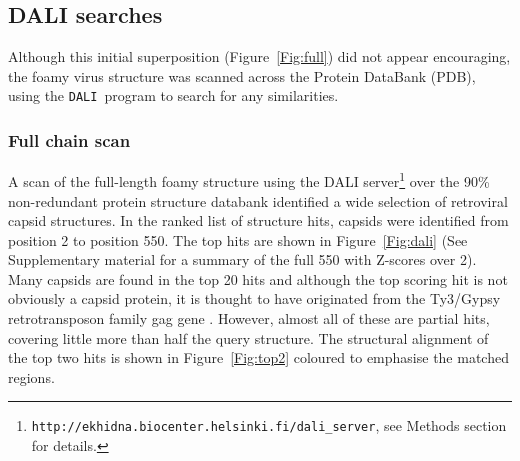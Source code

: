 \documentclass[12pt]{article}
\newcommand{\Fig}[1]{Figure~\ref{Fig:#1}}
\newcommand{\3}{$3_{10}$}
\newcommand{\DALI}{{\tt DALI}}
\begin{document}
\subsection{DALI searches}

Although this initial superposition (\Fig{full}) did not appear encouraging, the foamy virus structure
was scanned across the Protein DataBank (PDB), using the \DALI\ program \cite{HolmLet93a} to search for any similarities.

\subsubsection{Full chain scan}

A scan of the full-length foamy structure using the DALI server\footnote{
{\tt http://ekhidna.biocenter.helsinki.fi/dali\_server},
see Methods section for details.
}
over the 90\% non-redundant protein structure databank
identified a wide selection of retroviral capsid structures.  In the ranked list of structure hits,
capsids were identified from position 2 to position 550.
The top hits are shown in \Fig{dali} (See Supplementary material for a summary of
the full 550 with Z-scores over 2).    Many capsids are found in the top 20 hits and although the top
scoring hit is not obviously a capsid protein, it is thought to have originated from the Ty3/Gypsy
retrotransposon family gag gene \cite{ZhangWet15}.   However, almost all of these are partial
hits, covering little more than half the query structure.   The structural alignment of the top two hits
is shown in \Fig{top2} coloured to emphasise the matched regions.
\end{document}
